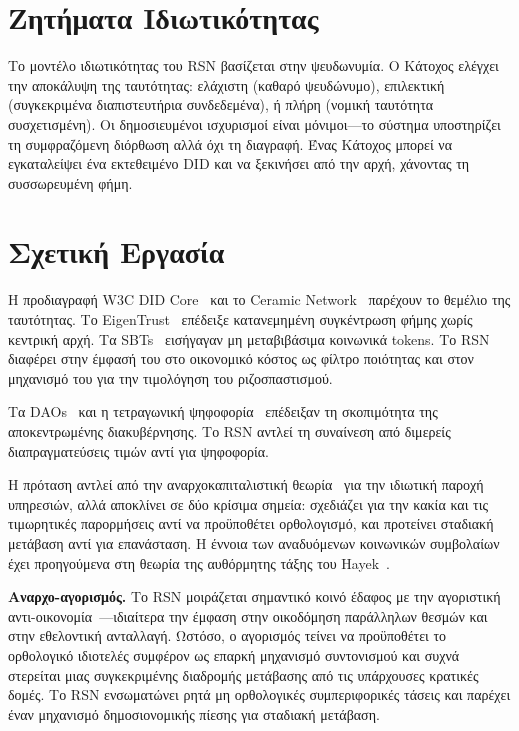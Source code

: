 \documentclass[11pt,a4paper,twocolumn]{article}
\begin{document}
\section{Ζητήματα Ιδιωτικότητας}

Το μοντέλο ιδιωτικότητας του RSN βασίζεται στην ψευδωνυμία. Ο Κάτοχος ελέγχει την αποκάλυψη της ταυτότητας: ελάχιστη (καθαρό ψευδώνυμο), επιλεκτική (συγκεκριμένα διαπιστευτήρια συνδεδεμένα), ή πλήρη (νομική ταυτότητα συσχετισμένη). Οι δημοσιευμένοι ισχυρισμοί είναι μόνιμοι---το σύστημα υποστηρίζει τη συμφραζόμενη διόρθωση αλλά όχι τη διαγραφή. Ένας Κάτοχος μπορεί να εγκαταλείψει ένα εκτεθειμένο DID και να ξεκινήσει από την αρχή, χάνοντας τη συσσωρευμένη φήμη.

\section{Σχετική Εργασία}

Η προδιαγραφή W3C DID Core~\cite{did2022} και το Ceramic Network~\cite{ceramic2023} παρέχουν το θεμέλιο της ταυτότητας. Το EigenTrust~\cite{kamvar2003} επέδειξε κατανεμημένη συγκέντρωση φήμης χωρίς κεντρική αρχή. Τα SBTs~\cite{weyl2022} εισήγαγαν μη μεταβιβάσιμα κοινωνικά tokens. Το RSN διαφέρει στην έμφασή του στο οικονομικό κόστος ως φίλτρο ποιότητας και στον μηχανισμό του για την τιμολόγηση του ριζοσπαστισμού.

Τα DAOs~\cite{buterin2014} και η τετραγωνική ψηφοφορία~\cite{buterin2019} επέδειξαν τη σκοπιμότητα της αποκεντρωμένης διακυβέρνησης. Το RSN αντλεί τη συναίνεση από διμερείς διαπραγματεύσεις τιμών αντί για ψηφοφορία.

Η πρόταση αντλεί από την αναρχοκαπιταλιστική θεωρία~\cite{rothbard1973,hoppe2001} για την ιδιωτική παροχή υπηρεσιών, αλλά αποκλίνει σε δύο κρίσιμα σημεία: σχεδιάζει για την κακία και τις τιμωρητικές παρορμήσεις αντί να προϋποθέτει ορθολογισμό, και προτείνει σταδιακή μετάβαση αντί για επανάσταση. Η έννοια των αναδυόμενων κοινωνικών συμβολαίων έχει προηγούμενα στη θεωρία της αυθόρμητης τάξης του Hayek~\cite{hayek1973}.

\textbf{Αναρχο-αγορισμός.} Το RSN μοιράζεται σημαντικό κοινό έδαφος με την αγοριστική αντι-οικονομία~\cite{konkin2006}---ιδιαίτερα την έμφαση στην οικοδόμηση παράλληλων θεσμών και στην εθελοντική ανταλλαγή. Ωστόσο, ο αγορισμός τείνει να προϋποθέτει το ορθολογικό ιδιοτελές συμφέρον ως επαρκή μηχανισμό συντονισμού και συχνά στερείται μιας συγκεκριμένης διαδρομής μετάβασης από τις υπάρχουσες κρατικές δομές. Το RSN ενσωματώνει ρητά μη ορθολογικές συμπεριφορικές τάσεις και παρέχει έναν μηχανισμό δημοσιονομικής πίεσης για σταδιακή μετάβαση.
\end{document}
